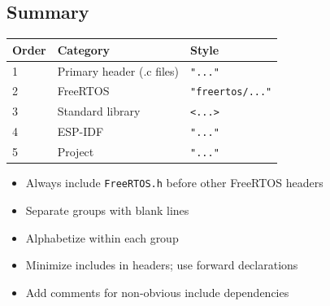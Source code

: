 \subsection{Summary}

\begin{center}
\begin{tabular}{|l|l|l|}
\hline
\textbf{Order} & \textbf{Category} & \textbf{Style} \\
\hline
1 & Primary header (.c files) & \texttt{"..."} \\
\hline
2 & FreeRTOS & \texttt{"freertos/..."} \\
\hline
3 & Standard library & \texttt{<...>} \\
\hline
4 & ESP-IDF & \texttt{"..."} \\
\hline
5 & Project & \texttt{"..."} \\
\hline
\end{tabular}
\end{center}

\begin{itemize}
    \item Always include \texttt{FreeRTOS.h} before other FreeRTOS headers
    \item Separate groups with blank lines
    \item Alphabetize within each group
    \item Minimize includes in headers; use forward declarations
    \item Add comments for non-obvious include dependencies
\end{itemize}

